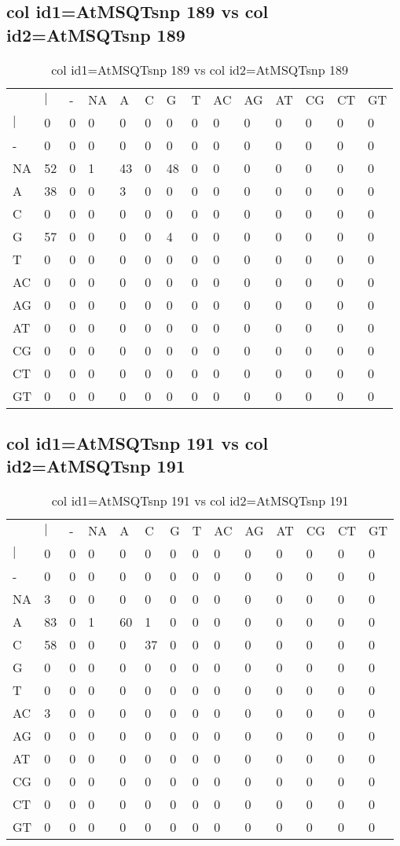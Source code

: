 \subsection{col id1=AtMSQTsnp 189 vs col id2=AtMSQTsnp 189}
\begin{center}
\begin{longtable}{|l|l|l|l|l|l|l|l|l|l|l|l|l|l|}
\caption{col id1=AtMSQTsnp 189 vs col id2=AtMSQTsnp 189} \label{table_dm568}\\
\hline
\\
\hline
&$|$&-&NA&A&C&G&T&AC&AG&AT&CG&CT&GT\\
$|$&0&0&0&0&0&0&0&0&0&0&0&0&0\\
-&0&0&0&0&0&0&0&0&0&0&0&0&0\\
NA&52&0&1&43&0&48&0&0&0&0&0&0&0\\
A&38&0&0&3&0&0&0&0&0&0&0&0&0\\
C&0&0&0&0&0&0&0&0&0&0&0&0&0\\
G&57&0&0&0&0&4&0&0&0&0&0&0&0\\
T&0&0&0&0&0&0&0&0&0&0&0&0&0\\
AC&0&0&0&0&0&0&0&0&0&0&0&0&0\\
AG&0&0&0&0&0&0&0&0&0&0&0&0&0\\
AT&0&0&0&0&0&0&0&0&0&0&0&0&0\\
CG&0&0&0&0&0&0&0&0&0&0&0&0&0\\
CT&0&0&0&0&0&0&0&0&0&0&0&0&0\\
GT&0&0&0&0&0&0&0&0&0&0&0&0&0\\
\hline
\end{longtable}
\end{center}

\subsection{col id1=AtMSQTsnp 191 vs col id2=AtMSQTsnp 191}
\begin{center}
\begin{longtable}{|l|l|l|l|l|l|l|l|l|l|l|l|l|l|}
\caption{col id1=AtMSQTsnp 191 vs col id2=AtMSQTsnp 191} \label{table_dm570}\\
\hline
\\
\hline
&$|$&-&NA&A&C&G&T&AC&AG&AT&CG&CT&GT\\
$|$&0&0&0&0&0&0&0&0&0&0&0&0&0\\
-&0&0&0&0&0&0&0&0&0&0&0&0&0\\
NA&3&0&0&0&0&0&0&0&0&0&0&0&0\\
A&83&0&1&60&1&0&0&0&0&0&0&0&0\\
C&58&0&0&0&37&0&0&0&0&0&0&0&0\\
G&0&0&0&0&0&0&0&0&0&0&0&0&0\\
T&0&0&0&0&0&0&0&0&0&0&0&0&0\\
AC&3&0&0&0&0&0&0&0&0&0&0&0&0\\
AG&0&0&0&0&0&0&0&0&0&0&0&0&0\\
AT&0&0&0&0&0&0&0&0&0&0&0&0&0\\
CG&0&0&0&0&0&0&0&0&0&0&0&0&0\\
CT&0&0&0&0&0&0&0&0&0&0&0&0&0\\
GT&0&0&0&0&0&0&0&0&0&0&0&0&0\\
\hline
\end{longtable}
\end{center}


